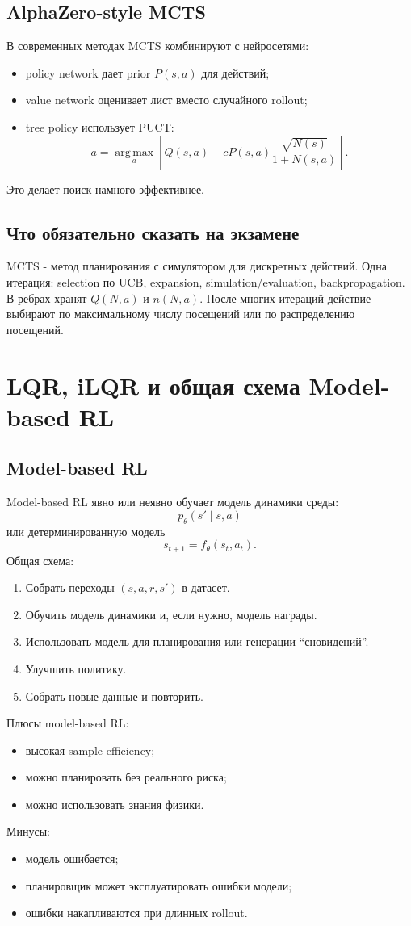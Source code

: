 \documentclass[11pt,a4paper]{article}
\newcommand{\argmax}{\operatorname*{arg\,max}}
\newcommand{\1}{\mathbf{1}}
\begin{document}
\subsection*{AlphaZero-style MCTS}
В современных методах MCTS комбинируют с нейросетями:
\begin{itemize}
    \item policy network дает prior $P(s,a)$ для действий;
    \item value network оценивает лист вместо случайного rollout;
    \item tree policy использует PUCT:
    \[
        a=\argmax_a\left[Q(s,a)+cP(s,a)\frac{\sqrt{N(s)}}{1+N(s,a)}\right].
    \]
\end{itemize}
Это делает поиск намного эффективнее.

\subsection*{Что обязательно сказать на экзамене}
MCTS - метод планирования с симулятором для дискретных действий. Одна итерация: selection по UCB, expansion, simulation/evaluation, backpropagation. В ребрах хранят $Q(N,a)$ и $n(N,a)$. После многих итераций действие выбирают по максимальному числу посещений или по распределению посещений.

\newpage
\section{LQR, iLQR и общая схема Model-based RL}

\subsection*{Model-based RL}
Model-based RL явно или неявно обучает модель динамики среды:
\[
    p_\theta(s'\mid s,a)
\]
или детерминированную модель
\[
    s_{t+1}=f_\theta(s_t,a_t).
\]
Общая схема:
\begin{enumerate}
    \item Собрать переходы $(s,a,r,s')$ в датасет.
    \item Обучить модель динамики и, если нужно, модель награды.
    \item Использовать модель для планирования или генерации ``сновидений''.
    \item Улучшить политику.
    \item Собрать новые данные и повторить.
\end{enumerate}

Плюсы model-based RL:
\begin{itemize}
    \item высокая sample efficiency;
    \item можно планировать без реального риска;
    \item можно использовать знания физики.
\end{itemize}
Минусы:
\begin{itemize}
    \item модель ошибается;
    \item планировщик может эксплуатировать ошибки модели;
    \item ошибки накапливаются при длинных rollout.
\end{itemize}
\end{document}
